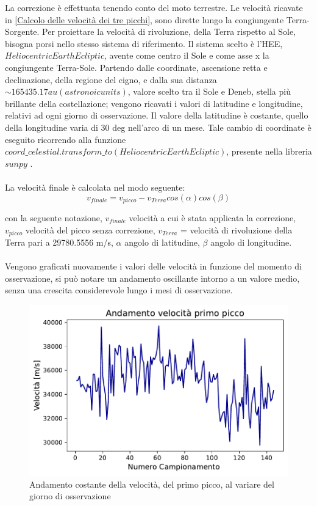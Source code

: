 La correzione è effettuata tenendo conto del moto terrestre. Le velocità ricavate in \ref{Calcolo delle velocità dei tre picchi}, sono dirette lungo la congiungente Terra-Sorgente. Per proiettare la velocità di rivoluzione, della Terra rispetto al Sole, bisogna porsi nello stesso sistema di riferimento. Il sistema scelto è l'HEE, $Heliocentric Earth Ecliptic$, avente come centro il Sole e come asse x la congiungente Terra-Sole. Partendo dalle coordinate, ascensione retta e declinazione, della regione del cigno, e dalla sua distanza $\sim 165435.17  au (astronoic units)$, valore scelto tra il Sole e Deneb, stella più brillante della costellazione; vengono ricavati i valori di latitudine e longitudine, relativi ad ogni giorno di osservazione. Il valore della latitudine è costante, quello della longitudine varia di 30 deg nell'arco di un mese. Tale cambio di coordinate è eseguito ricorrendo alla funzione $coord\_celestial.transform\_to(HeliocentricEarthEcliptic)$, presente nella libreria $sunpy$ \cite{Sunpy:sunpy_community2020}.
\\\\
La velocità finale è calcolata nel modo seguente: 
\begin{equation}
	v_{finale}=v_{picco}-v_{Terra}cos(\alpha)cos(\beta)
\end{equation}

con la seguente notazione, $v_{finale} $ velocità a cui è stata applicata la correzione, $v_{picco} $ velocità del picco senza correzione, $v_{Terra}$ = velocità di rivoluzione della Terra pari a 29780.5556 m/s, $\alpha$ angolo di latitudine, $\beta$ angolo di longitudine.
\\\\
Vengono graficati nuovamente i valori delle velocità in funzione del momento di osservazione, si può notare un andamento oscillante intorno a un valore medio, senza una crescita considerevole lungo i mesi di osservazione. 

\begin{figure}[H]
	\centering
	\includegraphics[scale=0.8]{Prima_SI.pdf}
	\caption{Andamento costante della velocità, del primo picco, al variare del giorno di osservazione}
    	\label{fig:Prima_NO}
\end{figure}


